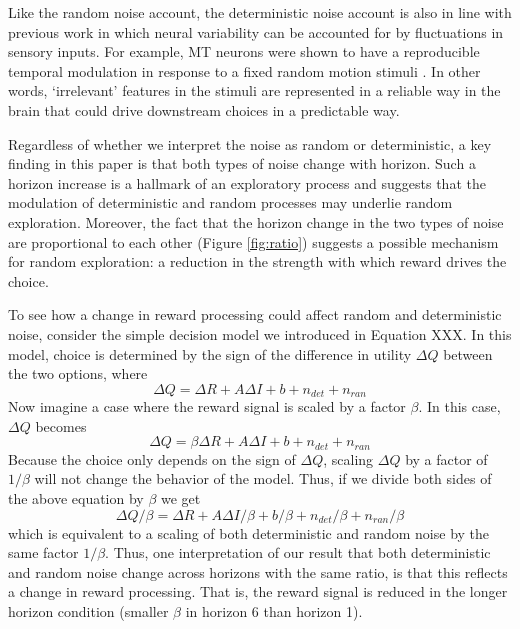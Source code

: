 \documentclass[12pt]{article}
\begin{document}
    Like the random noise account, the deterministic noise account is also in line with previous work in which neural variability can be accounted for by fluctuations in sensory inputs. For example, MT neurons were shown to have a reproducible temporal modulation in response to a fixed random motion stimuli \citep{Bair1996}. In other words, `irrelevant' features in the stimuli are represented in a reliable way in the brain that could drive downstream choices in a predictable way. 


    Regardless of whether we interpret the noise as random or deterministic, a key finding in this paper is that both types of noise change with horizon. Such a horizon increase is a hallmark of an exploratory process and suggests that the modulation of deterministic and random processes may underlie random exploration. Moreover, the fact that the horizon change in the two types of noise are proportional to each other (Figure \ref{fig:ratio}) suggests a possible mechanism for random exploration: a reduction in the strength with which reward drives the choice. 
    
    To see how a change in reward processing could affect random and deterministic noise, consider the simple decision model we introduced in Equation XXX. In this model, choice is determined by the sign of the difference in utility $\Delta Q$ between the two options, where
    \begin{equation}
    \label{eq:noise1}
        \Delta Q = 
        \Delta R + A \Delta I + b + n_{det} + n_{ran}
    \end{equation}
    Now imagine a case where the reward signal is scaled by a factor $\beta$.  In this case, $\Delta Q$ becomes
    \begin{equation}
    \label{eq:noise2}
        \Delta Q = 
        \beta \Delta R + A \Delta I + b + n_{det} + n_{ran}
    \end{equation}
    Because the choice only depends on the sign of $\Delta Q$, scaling $\Delta Q$ by a factor of $1/\beta$ will not change the behavior of the model.  Thus, if we divide both sides of the above equation by $\beta$ we get
    \begin{equation}
    \label{eq:noise3}
        \Delta Q / \beta = 
        \Delta R + A \Delta I / \beta + b / \beta + n_{det} / \beta + n_{ran} / \beta
    \end{equation}
    which is equivalent to a scaling of both deterministic and random noise by the same factor $1/\beta$. Thus, one interpretation of our result that both deterministic and random noise change across horizons with the same ratio, is that this reflects a change in reward processing. That is, the reward signal is reduced in the longer horizon condition (smaller $\beta$ in horizon 6 than horizon 1).  %
    
\end{document}
